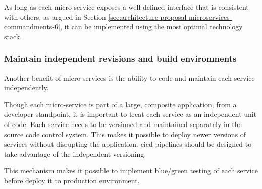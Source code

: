 As long as each micro-service exposes a well-defined interface that is consistent with others, as
argued in Section \ref{sec:architecture-proposal-microservices-commandments-6}, it can be implemented
using the most optimal technology stack.

\subsubsection*[Commandment 10]{Maintain independent revisions and build environments}
\label{sec:architecture-proposal-microservices-commandments-10}
Another benefit of micro-services is the ability to code and maintain each service independently.

Though each micro-service is part of a large, composite application, from a developer standpoint, it
is important to treat each service as an independent unit of code. Each service needs to be versioned
and maintained separately in the source code control system. This makes it possible to deploy newer
versions of services without disrupting the application. \ac{cicd} pipelines should be designed to
take advantage of the independent versioning.

This mechanism makes it possible to implement blue/green testing of each service before deploy it to
production environment.